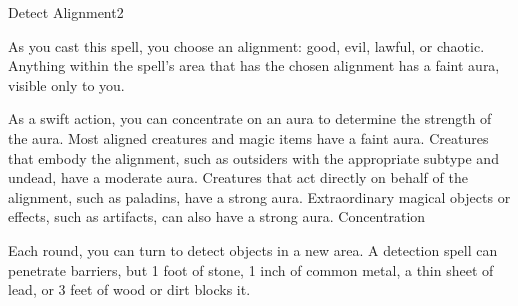 \begin{spellsection}{Detect Alignment}{2}
    \begin{spellheader}
    \end{spellheader}
    \begin{spellcontent}
        \begin{spelltargetinginfo}
        \end{spelltargetinginfo}
        \begin{spelleffects}
            \spelleffect As you cast this spell, you choose an alignment: good, evil, lawful, or chaotic. Anything within the spell's area that has the chosen alignment has a faint aura, visible only to you.

            As a swift action, you can concentrate on an aura to determine the strength of the aura. Most aligned creatures and magic items have a faint aura. Creatures that embody the alignment, such as outsiders with the appropriate subtype and undead,  have a moderate aura. Creatures that act directly on behalf of the alignment, such as paladins, have a strong aura. Extraordinary magical objects or effects, such as artifacts, can also have a strong aura.
            \spelldur Concentration
        \end{spelleffects}
    \end{spellcontent}
    \begin{spellfooter}
        \spellnotes Each round, you can turn to detect objects in a new area. A detection spell can penetrate barriers, but 1 foot of stone, 1 inch of common metal, a thin sheet of lead, or 3 feet of wood or dirt blocks it.
        \miscastexplode
    \end{spellfooter}
\end{spellsection}

